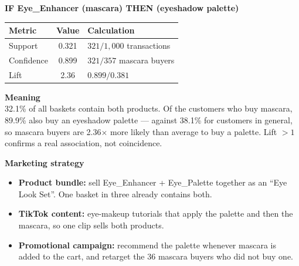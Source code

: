 \documentclass[11pt,a4paper]{article}
\newcommand{\pcode}[1]{{\codefont\small #1}}
\begin{document}
\begin{center}
\textbf{IF \pcode{Eye\_Enhancer} (mascara) \quad THEN \quad \pcode{Eye\_Palette} (eyeshadow palette)}
\end{center}

\begin{center}
\begin{tabular}{lcl}
\toprule
\textbf{Metric} & \textbf{Value} & \textbf{Calculation} \\
\midrule
Support    & 0.321 & $321 / 1{,}000$ transactions \\
Confidence & 0.899 & $321 / 357$ mascara buyers \\
Lift       & 2.36  & $0.899 / 0.381$ \\
\bottomrule
\end{tabular}
\end{center}

\textbf{Meaning}\\
32.1\% of all baskets contain both products. Of the customers who buy mascara, 89.9\% also buy an
eyeshadow palette — against 38.1\% for customers in general, so mascara buyers are 2.36$\times$
more likely than average to buy a palette. Lift $> 1$ confirms a real association, not coincidence.

\textbf{Marketing strategy}
\begin{itemize}[leftmargin=*]
  \item \textbf{Product bundle:} sell \pcode{Eye\_Enhancer + Eye\_Palette} together as an
  ``Eye Look Set''. One basket in three already contains both.
  \item \textbf{TikTok content:} eye-makeup tutorials that apply the palette and then the mascara,
  so one clip sells both products.
  \item \textbf{Promotional campaign:} recommend the palette whenever mascara is added to the cart,
  and retarget the 36 mascara buyers who did not buy one.
\end{itemize}
\end{document}

